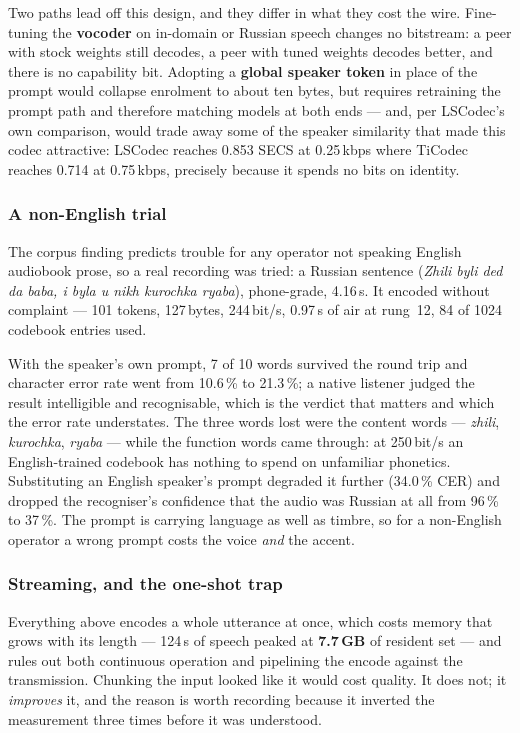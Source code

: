 Two paths lead off this design, and they differ in what they cost the
wire.  Fine-tuning the \textbf{vocoder} on in-domain or Russian speech
changes no bitstream: a peer with stock weights still decodes, a peer
with tuned weights decodes better, and there is no capability bit.
Adopting a \textbf{global speaker token} in place of the prompt would
collapse enrolment to about ten bytes, but requires retraining the
prompt path and therefore matching models at both ends --- and, per
LSCodec's own comparison, would trade away some of the speaker
similarity that made this codec attractive: LSCodec reaches 0.853 SECS
at 0.25\,kbps where TiCodec reaches 0.714 at 0.75\,kbps, precisely
because it spends no bits on identity.

\subsubsection{A non-English trial}

The corpus finding predicts trouble for any operator not speaking
English audiobook prose, so a real recording was tried: a Russian
sentence (\emph{Zhili byli ded da baba, i byla u nikh kurochka
ryaba}), phone-grade, 4.16\,s.  It encoded without complaint ---
101 tokens, 127\,bytes, 244\,bit/s, 0.97\,s of air at rung~12, 84 of
1024 codebook entries used.

With the speaker's own prompt, 7 of 10 words survived the round trip
and character error rate went from 10.6\,\% to 21.3\,\%; a native
listener judged the result intelligible and recognisable, which is the
verdict that matters and which the error rate understates.  The three
words lost were the content words --- \emph{zhili}, \emph{kurochka},
\emph{ryaba} --- while the function words came through: at 250\,bit/s
an English-trained codebook has nothing to spend on unfamiliar
phonetics.  Substituting an English speaker's prompt degraded it
further (34.0\,\% CER) and dropped the recogniser's confidence that
the audio was Russian at all from 96\,\% to 37\,\%.  The prompt is
carrying language as well as timbre, so for a non-English operator a
wrong prompt costs the voice \emph{and} the accent.

\subsubsection{Streaming, and the one-shot trap}
\label{sec:voice_stream}

Everything above encodes a whole utterance at once, which costs memory
that grows with its length --- 124\,s of speech peaked at
\textbf{7.7\,GB} of resident set --- and rules out both continuous
operation and pipelining the encode against the transmission.  Chunking
the input looked like it would cost quality.  It does not; it
\emph{improves} it, and the reason is worth recording because it
inverted the measurement three times before it was understood.

